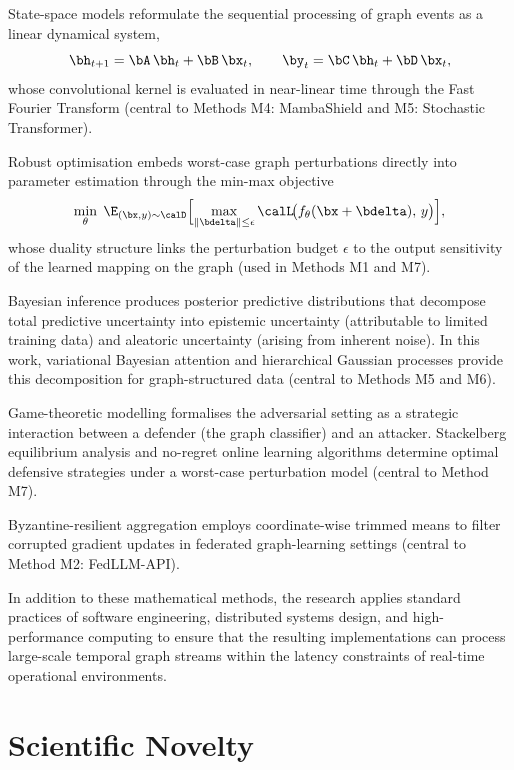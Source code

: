 State-space models reformulate the sequential processing of graph events as a linear dynamical system,
\begin{equation}
\bh_{t+1} = \bA\,\bh_t + \bB\,\bx_t, \qquad
\by_t = \bC\,\bh_t + \bD\,\bx_t,
\label{eq:ssm}
\end{equation}
whose convolutional kernel is evaluated in near-linear time through the Fast Fourier Transform (central to Methods M4: MambaShield and M5: Stochastic Transformer).

Robust optimisation embeds worst-case graph perturbations directly into parameter estimation through the min-max objective
\begin{equation}
\min_\theta\;
\E_{(\bx,y)\sim\calD}
\Bigl[
  \max_{\|\bdelta\|\le\epsilon}
    \calL\!\bigl(f_\theta(\bx+\bdelta),\,y\bigr)
\Bigr],
\label{eq:robust_opt}
\end{equation}
whose duality structure links the perturbation budget $\epsilon$ to the output sensitivity of the learned mapping on the graph (used in Methods M1 and M7).

Bayesian inference produces posterior predictive distributions that decompose total predictive uncertainty into epistemic uncertainty (attributable to limited training data) and aleatoric uncertainty (arising from inherent noise). In this work, variational Bayesian attention and hierarchical Gaussian processes provide this decomposition for graph-structured data (central to Methods M5 and M6).

Game-theoretic modelling formalises the adversarial setting as a strategic interaction between a defender (the graph classifier) and an attacker. Stackelberg equilibrium analysis and no-regret online learning algorithms determine optimal defensive strategies under a worst-case perturbation model (central to Method M7).

Byzantine-resilient aggregation employs coordinate-wise trimmed means to filter corrupted gradient updates in federated graph-learning settings (central to Method M2: FedLLM-API).

In addition to these mathematical methods, the research applies standard practices of software engineering, distributed systems design, and high-performance computing to ensure that the resulting implementations can process large-scale temporal graph streams within the latency constraints of real-time operational environments.


\section*{Scientific Novelty}

